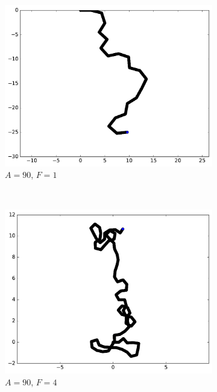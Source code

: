 \begin{appendices}
\begin{figure}[htbp]
\begin{subfigure}[t]{\subImgWmo}
			\centering
			\includegraphics[width=\textwidth]{figures/ch3/synTraj_219_90_1}
			\caption[$A = 90$, $F=1$]{$A = 90$, $F=1$}
			\label{fig:synTraj_219_90_1}
		\end{subfigure}
		~
		\begin{subfigure}[t]{\subImgWmo}
			\centering
			\includegraphics[width=\textwidth]{figures/ch3/synTraj_219_90_4}
			\caption[$A = 90$, $F=4$]{$A = 90$, $F=4$}
			\label{fig:synTraj_219_90_4}
		\end{subfigure}
		~
		\begin{subfigure}[t]{\subImgWmo}
			\centering

\end{subfigure}
\end{figure}
\end{appendices}
